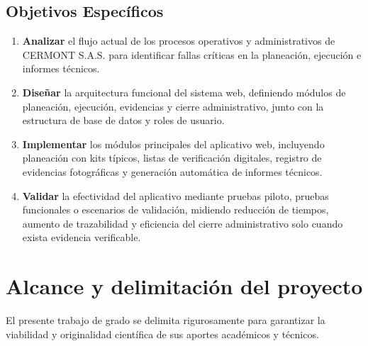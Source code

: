 \subsection{Objetivos Específicos}
\begin{enumerate}
    \item \textbf{Analizar} el flujo actual de los procesos operativos y administrativos de CERMONT S.A.S. para identificar fallas críticas en la planeación, ejecución e informes técnicos.
    \item \textbf{Diseñar} la arquitectura funcional del sistema web, definiendo módulos de planeación, ejecución, evidencias y cierre administrativo, junto con la estructura de base de datos y roles de usuario.
    \item \textbf{Implementar} los módulos principales del aplicativo web, incluyendo planeación con kits típicos, listas de verificación digitales, registro de evidencias fotográficas y generación automática de informes técnicos.
    \item \textbf{Validar} la efectividad del aplicativo mediante pruebas piloto, pruebas funcionales o escenarios de validación, midiendo reducción de tiempos, aumento de trazabilidad y eficiencia del cierre administrativo solo cuando exista evidencia verificable.
\end{enumerate}

\section{Alcance y delimitación del proyecto}
\label{sec:alcance}

El presente trabajo de grado se delimita rigurosamente para garantizar la viabilidad y originalidad científica de sus aportes académicos y técnicos.

